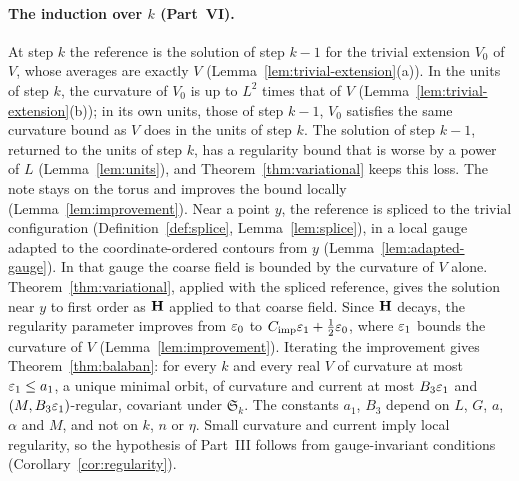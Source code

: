 \paragraph{The induction over $k$ (Part~VI).} At step $k$ the reference is the solution of step $k-1$ for the trivial extension $V_0$ of $V$, whose averages are exactly $V$ (Lemma~\ref{lem:trivial-extension}(a)). In the units of step $k$, the curvature of $V_0$ is up to $L^2$ times that of $V$ (Lemma~\ref{lem:trivial-extension}(b)); in its own units, those of step $k-1$, $V_0$ satisfies the same curvature bound as $V$ does in the units of step $k$. The solution of step $k-1$, returned to the units of step $k$, has a regularity bound that is worse by a power of $L$ (Lemma~\ref{lem:units}), and Theorem~\ref{thm:variational} keeps this loss. The note stays on the torus and improves the bound locally (Lemma~\ref{lem:improvement}). Near a point $y$, the reference is spliced to the trivial configuration (Definition~\ref{def:splice}, Lemma~\ref{lem:splice}), in a local gauge adapted to the coordinate-ordered contours from $y$ (Lemma~\ref{lem:adapted-gauge}). In that gauge the coarse field is bounded by the curvature of $V$ alone. Theorem~\ref{thm:variational}, applied with the spliced reference, gives the solution near $y$ to first order as $\mathbf H$ applied to that coarse field. Since $\mathbf H$ decays, the regularity parameter improves from $\varepsilon_0$ to $C_{\rm imp}\varepsilon_1+\frac12\varepsilon_0$, where $\varepsilon_1$ bounds the curvature of $V$ (Lemma~\ref{lem:improvement}). Iterating the improvement gives Theorem~\ref{thm:balaban}: for every $k$ and every real $V$ of curvature at most $\varepsilon_1\le a_1$, a unique minimal orbit, of curvature and current at most $B_3\varepsilon_1$ and $(M,B_3\varepsilon_1)$-regular, covariant under $\mathfrak S_k$. The constants $a_1$, $B_3$ depend on $L$, $G$, $a$, $\alpha$ and $M$, and not on $k$, $n$ or $\eta$. Small curvature and current imply local regularity, so the hypothesis of Part~III follows from gauge-invariant conditions (Corollary~\ref{cor:regularity}).

